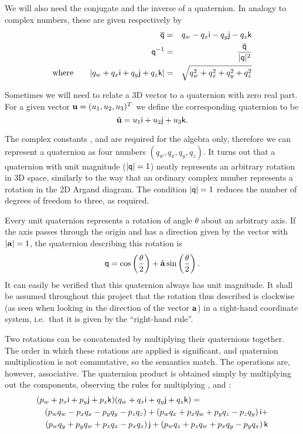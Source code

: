 We will also need the conjugate and the inverse of a quaternion. In analogy to
complex numbers, these are given respectively by
\begin{eqnarray}
\overline{\mathsf{q}} & = & q_w - q_x\mathsf{i} - q_y\mathsf{j} - q_z\mathsf{k} \label{quatConjugate}\\
\mathsf{q}^{-1} & = & \frac{\overline{\mathsf{q}}}{|\mathsf{q}|^2} \label{quatInverse}\\
\mathrm{where}\quad\quad |q_w + q_x\mathsf{i} + q_y\mathsf{j} + q_z\mathsf{k}| &=&
    \sqrt{q_w^2 + q_x^2 + q_y^2 + q_z^2} \label{quatMagnitude}
\end{eqnarray}

Sometimes we will need to relate a 3D vector to a quaternion with zero real part.
For a given vector $\ve{u} = (u_1, u_2, u_3)^T$ we define the corresponding
quaternion to be
\begin{equation}
\label{vectorToQuat}
\tilde{\ve{u}} = u_1\qi + u_2\qj + u_3\qk.
\end{equation}

The complex constants \qi{}, \qj{} and \qk{} are required for the algebra only, therefore we can
represent a quaternion as four numbers $(q_w,q_x,q_y,q_z)$. It turns out that a quaternion
with unit magnitude ($|\mathsf{q}| = 1$) neatly represents an arbitrary rotation in
3D space, similarly to the way that an ordinary complex number represents a rotation in the 2D
Argand diagram. The condition $|\mathsf{q}| = 1$ reduces the number of degrees of freedom to
three, as required.

Every unit quaternion represents a rotation of angle $\theta$ about an arbitrary axis.
If the axis passes through the origin and has a direction given by the vector
 with $\norm{\ve{a}} = 1$, the quaternion describing this rotation is
\begin{equation}
\label{quatRotation}
\q{q} = \cos\left(\frac{\theta}{2}\right) + \tilde{\ve{a}} \sin\left(\frac{\theta}{2}\right).
\end{equation}
It can easily be verified that this quaternion always has unit magnitude. It shall be assumed
throughout this project that the rotation thus described is clockwise (as seen when looking in
the direction of the vector $\ve{a}$) in a right-hand coordinate system, i.e.\ that it is
given by the ``right-hand rule''.

Two rotations can be concatenated by multiplying their quaternions together. The order in which
these rotations are applied is significant, and quaternion multiplication is not commutative,
so the semantics match. The operations are, however, associative. The quaternion product is
obtained simply by multiplying out the components, observing the rules for multiplying \qi{},
\qj{} and \qk{}:
\begin{eqnarray}
\lefteqn{(p_w + p_x\qi + p_y\qj + p_z\qk)(q_w + q_x\qi + q_y\qj + q_z\qk) = } \nonumber\\*
&& (p_w q_w - p_x q_x - p_y q_y - p_z q_z) + 
   (p_w q_x + p_x q_w + p_y q_z - p_z q_y) \,\qi + \nonumber\\*
&& (p_w q_y + p_y q_w + p_z q_x - p_x q_z) \,\qj + 
   (p_w q_z + p_z q_w + p_x q_y - p_y q_x) \,\qk \label{quatProduct}
\end{eqnarray}

